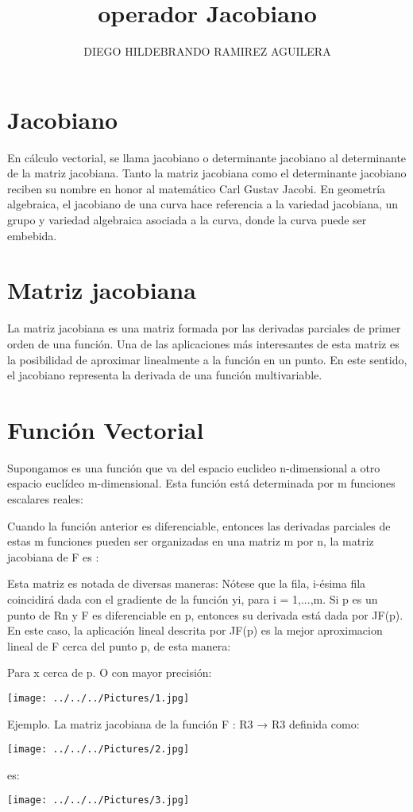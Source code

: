 \documentclass[12pt,a4paper]{article}
\author{DIEGO HILDEBRANDO RAMIREZ AGUILERA}
\title{operador Jacobiano}
\begin{document}
\maketitle

\section{Jacobiano}
En cálculo vectorial, se llama jacobiano o determinante jacobiano al determinante de la matriz jacobiana. Tanto la matriz jacobiana como el determinante jacobiano reciben su nombre en honor al matemático Carl Gustav Jacobi.
En geometría algebraica, el jacobiano de una curva hace referencia a la variedad jacobiana, un grupo y variedad algebraica asociada a la curva, donde la curva puede ser embebida.

\section{Matriz jacobiana}
La matriz jacobiana es una matriz formada por las derivadas parciales de primer orden de una función. Una de las aplicaciones más interesantes de esta matriz es la posibilidad de aproximar linealmente a la función en un punto. En este sentido, el jacobiano representa la derivada de una función multivariable.

\section{Función Vectorial}
Supongamos   es una función que va del espacio euclideo n-dimensional a otro espacio euclídeo m-dimensional. Esta función está determinada por m funciones escalares reales:


Cuando la función anterior es diferenciable, entonces las derivadas parciales de estas m funciones pueden ser organizadas en una matriz m por n, la matriz jacobiana de F es :

Esta matriz es notada de diversas maneras:
Nótese que la fila, i-ésima fila coincidirá dada con el gradiente de la función yi, para i = 1,...,m.
Si p es un punto de Rn y F es diferenciable en p, entonces su derivada está dada por JF(p). En este caso, la aplicación lineal descrita por JF(p) es la mejor aproximacion lineal de F cerca del punto p, de esta manera:

Para x cerca de p. O con mayor precisión: 

\texttt{[image: ../../../Pictures/1.jpg]} 

Ejemplo. La matriz jacobiana de la función F : R3 → R3 definida como:

\texttt{[image: ../../../Pictures/2.jpg]} 

es:

\texttt{[image: ../../../Pictures/3.jpg]} 
\end{document}
